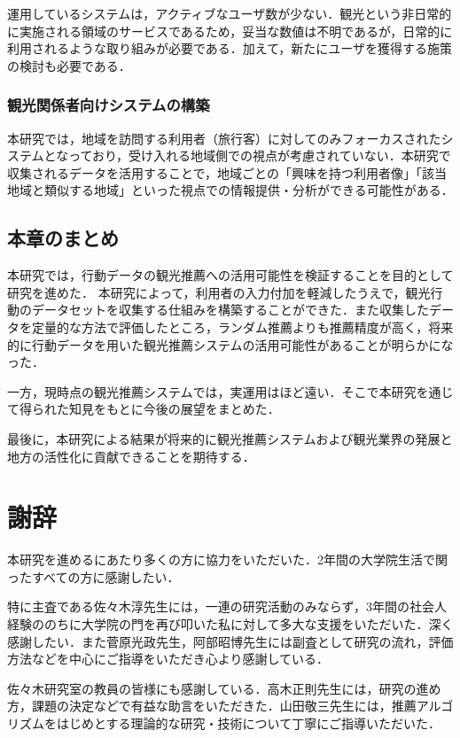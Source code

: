\documentclass{jsarticle}
\begin{document}
運用しているシステムは，アクティブなユーザ数が少ない．観光という非日常的に実施される領域のサービスであるため，妥当な数値は不明であるが，日常的に利用されるような取り組みが必要である．加えて，新たにユーザを獲得する施策の検討も必要である．

\subsubsection{観光関係者向けシステムの構築}

本研究では，地域を訪問する利用者（旅行客）に対してのみフォーカスされたシステムとなっており，受け入れる地域側での視点が考慮されていない．本研究で収集されるデータを活用することで，地域ごとの「興味を持つ利用者像」「該当地域と類似する地域」といった視点での情報提供・分析ができる可能性がある．

\subsection{本章のまとめ}

本研究では，行動データの観光推薦への活用可能性を検証することを目的として研究を進めた．
本研究によって，利用者の入力付加を軽減したうえで，観光行動のデータセットを収集する仕組みを構築することができた．また収集したデータを定量的な方法で評価したところ，ランダム推薦よりも推薦精度が高く，将来的に行動データを用いた観光推薦システムの活用可能性があることが明らかになった．

一方，現時点の観光推薦システムでは，実運用はほど遠い．そこで本研究を通じて得られた知見をもとに今後の展望をまとめた．

最後に，本研究による結果が将来的に観光推薦システムおよび観光業界の発展と地方の活性化に貢献できることを期待する．

\newpage

\section*{謝辞}

本研究を進めるにあたり多くの方に協力をいただいた．2年間の大学院生活で関ったすべての方に感謝したい．

特に主査である佐々木淳先生には，一連の研究活動のみならず，3年間の社会人経験ののちに大学院の門を再び叩いた私に対して多大な支援をいただいた．深く感謝したい．また菅原光政先生，阿部昭博先生には副査として研究の流れ，評価方法などを中心にご指導をいただき心より感謝している．

佐々木研究室の教員の皆様にも感謝している．高木正則先生には，研究の進め方，課題の決定などで有益な助言をいただきた．山田敬三先生には，推薦アルゴリズムをはじめとする理論的な研究・技術について丁寧にご指導いただいた．
\end{document}
